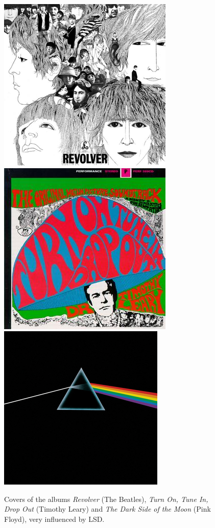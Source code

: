 \begin{figure}[H]
	\centering
	\includegraphics[height=.2\textheight]{media/10-revolver.jpg}
	\includegraphics[height=.2\textheight]{media/10-leary.jpg}
	\includegraphics[height=.2\textheight]{media/10-dsotm.png}
	\caption{Covers of the albums \textit{Revolver} (The Beatles), \textit{Turn On, Tune In, Drop Out} (Timothy Leary) and \textit{The Dark Side of the Moon} (Pink Floyd), very influenced by LSD.}
	\label{albums}
\end{figure}

